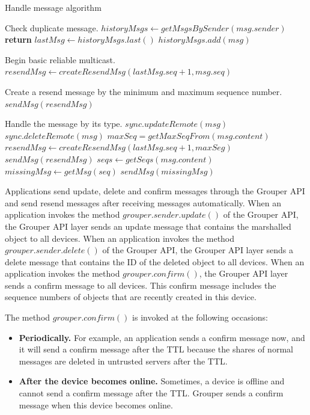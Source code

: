 \documentclass[twocolumn,10pt]{article}
\begin{document}
\begin{algorithm}[t]
	\caption{Handle message algorithm}\label{alg:euclid}
	\begin{algorithmic}[1]		
		\LeftComment Check duplicate message.
		\State  $historyMsgs \gets getMsgsBySender(msg.sender)$
		\State \textbf{return}
		\EndIf
		\State $lastMsg \gets historyMsgs.last()$
		\State $historyMsgs.add(msg)$
		 
		\LeftComment Begin basic reliable multicast.
		\State $resendMsg \gets createResendMsg(lastMsg.seq + 1, msg.seq)$
		
		\Comment Create a resend message by the minimum and maximum sequence number.
		\State $sendMsg(resendMsg)$
		\EndIf
		
		\LeftComment Handle the message by its type.
		\State $sync.updateRemote(msg)$
		\State $sync.deleteRemote(msg)$
		\State $maxSeq = getMaxSeqFrom(msg.content)$
		\State $resendMsg \gets createResendMsg(lastMsg.seq + 1, maxSeg)$
			\State $sendMsg(resendMsg)$
			\EndIf
		\State $seqs \gets getSeqs(msg.content)$
		\State $missingMsg \gets getMsg(seq)$
		\State $sendMsg(missingMsg)$
		\EndFor
		\EndIf
		\EndProcedure
	\end{algorithmic}
\end{algorithm}

Applications send update, delete and confirm messages through the Grouper API and send resend messages after receiving messages automatically.
When an application invokes the method $grouper.sender.update()$ of the Grouper API, the Grouper API layer sends an update message that contains the marshalled object to all devices.
When an application invokes the method $grouper.sender.delete()$ of the Grouper API, the Grouper API layer sends a delete message that contains the ID of the deleted object to all devices. 
When an application invokes the method $grouper.confirm()$, the Grouper API layer sends a confirm message to all devices. 
This confirm message includes the sequence numbers of objects that are recently created in this device.

The method $grouper.confirm()$ is invoked at the following occasions:

\begin{itemize}
	\setlength{\itemsep}{1pt}
	\setlength{\parskip}{0pt}
	\setlength{\parsep}{0pt}
	\item \textbf{Periodically.}
	For example, an application sends a confirm message now, and it will send a confirm message after the TTL because the shares of normal messages are deleted in untrusted servers after the TTL.
	\item \textbf{After the device becomes online.} 
	Sometimes, a device is offline and cannot send a confirm message after the TTL.
	Grouper sends a confirm message when this device becomes online.
\end{itemize}
\end{document}
